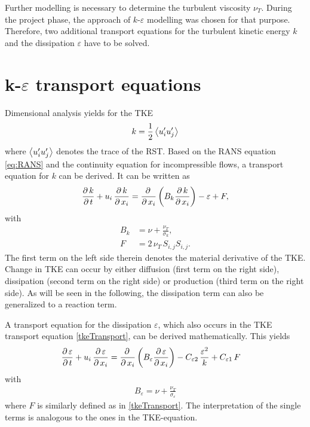 \noii Further modelling is necessary to determine the turbulent viscosity $\nu_T$. During the project phase, the approach of $k$-$\varepsilon$ modelling was chosen for that purpose. Therefore, two additional transport equations for the turbulent kinetic energy $k$ and the dissipation $\varepsilon$ have to be solved.

\section{k-$\varepsilon$ transport equations} %
\label{sec:k_epsilon_transport_equations}

Dimensional analysis yields for the TKE
\begin{equation}
	k = \frac{1}{2} \left\langle u_i^{\prime}u_j^{\prime} \right\rangle
\end{equation}
where $\left\langle u_i^{\prime}u_j^{\prime} \right\rangle$ denotes the trace of the RST. Based on the RANS equation \eqref{eq:RANS} and the continuity equation for incompressible flows, a transport equation for $k$ can be derived.
It can be written as
\begin{equation} \label{tkeTransport}
	\frac{\partial\,k}{\partial\,t} + u_i\,\frac{\partial\,k}{\partial\,x_i}
	=
	\frac{\partial\,}{\partial\,x_i}\left(  B_k \frac{\partial\,k}{\partial\,x_i} \right) 
	-
	\varepsilon
	+
	F,
\end{equation}
with
\begin{equation}
	\begin{split}
		B_k &= \nu + \frac{\nu_T}{\sigma_k},\\
		F   &= 2\,\nu_T\,S_{i,j}S_{i,j}.
	\end{split}
\end{equation}
The first term on the left side therein denotes the material derivative of the TKE. Change in TKE can occur by either diffusion (first term on the right side), dissipation (second term on the right side) or production (third term on the right side). As will be seen in the following, the dissipation term can also be generalized to a reaction term.

\noii A transport equation for the dissipation $\varepsilon$, which also occurs in the TKE transport equation \eqref{tkeTransport}, can be derived mathematically. This yields
\begin{equation}
	\begin{split}
		\frac{\partial\,\varepsilon}{\partial\,t} + u_i\,\frac{\partial\,\varepsilon}{\partial\,x_i}
		&=
		\frac{\partial\,}{\partial\,x_i}\left( B_\varepsilon \frac{\partial\,\varepsilon}{\partial\,x_i} \right) 
		-
		C_{\varepsilon 2}\,\frac{\varepsilon^2}{k}
		+
		C_{\varepsilon 1}\,F
	\end{split}
\end{equation}
with
\begin{equation}
	\begin{split}
		B_\varepsilon = \nu + \frac{\nu_T}{\sigma_\varepsilon}
	\end{split}
\end{equation}
where $F$ is similarly defined as in \eqref{tkeTransport}. The interpretation of the single terms is analogous to the ones in the TKE-equation. 

